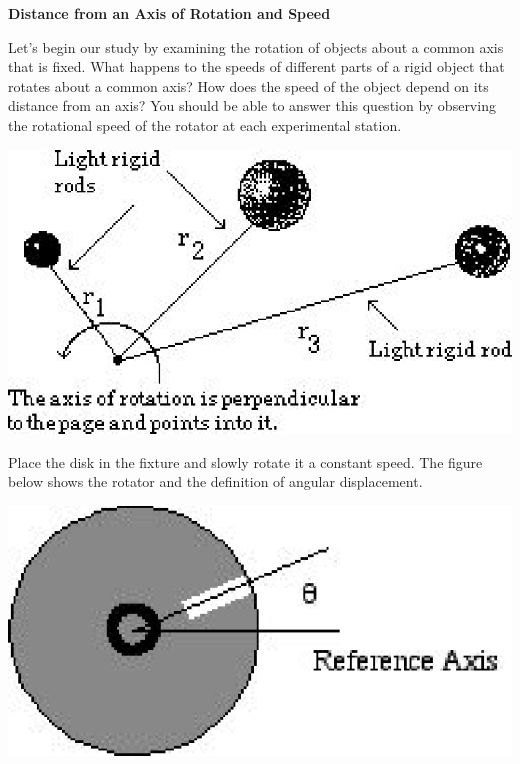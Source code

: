 \textbf{Distance from an Axis of Rotation and Speed }

Let's begin our study by examining the rotation of objects about a common axis
that is fixed. What happens to the speeds of different parts of a rigid object
that rotates about a common axis? How does the speed of the object depend on
its distance from an axis? You should be able to answer this question by observing
the rotational speed of the rotator at each experimental station.

\vspace{0.3cm}
{\par\centering \includegraphics{rotation_fig5.eps} \par}
\vspace{0.3cm}

Place the disk in the fixture and slowly rotate it a constant speed. The figure
below shows the rotator and the definition of angular displacement.

\vspace{0.3cm}
{\par\centering \includegraphics{rotation_fig6.eps} \par}
\vspace{0.3cm}

